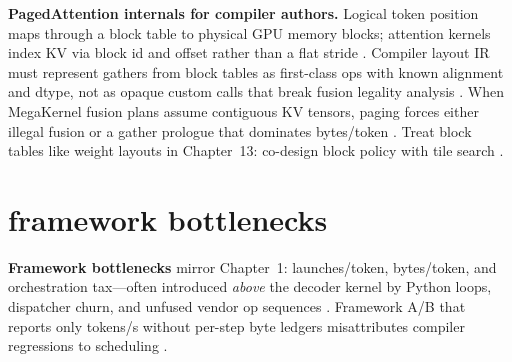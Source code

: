 \textbf{PagedAttention internals for compiler authors.} Logical token position maps through a block table to physical GPU memory blocks; attention kernels index KV via block id and offset rather than a flat stride \citep{kwon2023vllm,dao2022flashattention,dao2023flashdecoding,patel2025llminference,memoryfloor2026,yirage2026,chen2020compilerbasedhardw,taxbreak2026,dlbook,liu2024deepseekv3,semianalysis2024tma,nvidia2022hopper,nvidia2024cudagraphs,amd2024xdna,amd2024aie,dlbook}. Compiler layout IR must represent gathers from block tables as first-class ops with known alignment and dtype, not as opaque custom calls that break fusion legality analysis \citep{yirage2026,chen2020compilerbasedhardw,kwon2023vllm,patel2025llminference,dao2022flashattention,dao2023flashdecoding,memoryfloor2026,taxbreak2026,dlbook,liu2024deepseekv3,semianalysis2024tma,amd2024aie,amd2024xdna,nvidia2022hopper,nvidia2024cudagraphs,dlbook}. When MegaKernel fusion plans assume contiguous KV tensors, paging forces either illegal fusion or a gather prologue that dominates bytes/token \citep{yirage2026,chen2020compilerbasedhardw,kwon2023vllm,taxbreak2026,memoryfloor2026,patel2025llminference,dao2022flashattention,dao2023flashdecoding,dlbook,semianalysis2024tma,liu2024deepseekv3,amd2024xdna,amd2024aie,nvidia2022hopper,nvidia2024cudagraphs,dlbook}. Treat block tables like weight layouts in Chapter~13: co-design block policy with tile search \citep{yirage2026,chen2020compilerbasedhardw,kwon2023vllm,patel2025llminference,memoryfloor2026,taxbreak2026,dao2022flashattention,dlbook}.

\section{framework bottlenecks}
\label{sec:ch28_framework_bottlenecks}

\textbf{Framework bottlenecks} mirror Chapter~1: launches/token, bytes/token, and orchestration tax---often introduced \emph{above} the decoder kernel by Python loops, dispatcher churn, and unfused vendor op sequences \citep{taxbreak2026,memoryfloor2026,patel2025llminference,kwon2023vllm,yirage2026,chen2020compilerbasedhardw,liu2024deepseekv3,nvidia2024cudagraphs,dao2022flashattention,dao2023flashdecoding,semianalysis2024tma,dlbook,amd2024xdna,amd2024aie,nvidia2022hopper}. Framework A/B that reports only tokens/s without per-step byte ledgers misattributes compiler regressions to scheduling \citep{patel2025llminference,taxbreak2026,memoryfloor2026,yirage2026,chen2020compilerbasedhardw,dlbook}.

